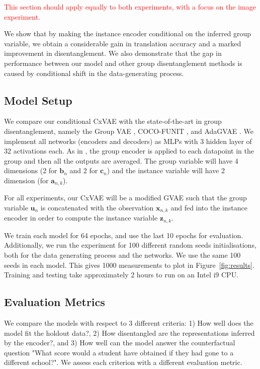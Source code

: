 \documentclass{article} %
\newcommand{\todo}[1]{\textcolor{red}{#1}}
\begin{document}
\todo{This section should apply equally to both experiments, with a focus on the image experiment.}

We show that by making the instance encoder conditional on the inferred group variable, we obtain a considerable gain in translation accuracy and a marked improvement in disentanglement. We also demonstrate that the gap in performance between our model and other group disentanglement methods is caused by conditional shift in the data-generating process.

\subsection{Model Setup}
\label{sec:setup}

We compare our conditional CxVAE with the state-of-the-art in group disentanglement, namely the Group VAE \citep{Hosoya2019GroupbasedLO, Bouchacourt2018MultiLevelVA}, COCO-FUNIT \citep{Saito2020Coco}, and AdaGVAE \citep{Locatello2019ChallengingCA}. We implement all networks (encoders and decoders) as MLPs with 3 hidden layer of 32 activations each. As in \citet{Hosoya2019GroupbasedLO}, the group encoder is applied to each datapoint in the group and then all the outputs are averaged. The group variable will have 4 dimensions (2 for $\mathbf{b}_n$ and 2 for $\mathbf{c}_n$) and the instance variable will have 2 dimension (for $\mathbf{a}_{n,k}$). 

For all experiments, our CxVAE will be a modified GVAE such that the group variable $\mathbf{u}_n$ is concatenated with the observation $\mathbf{x}_{n,k}$ and fed into the instance encoder in order to compute the instance variable $\mathbf{z}_{n,k}$.

We train each model for 64 epochs, and use the last 10 epochs for evaluation. Additionally, we run the experiment for 100 different random seeds initialisations, both for the data generating process and the networks. We use the same 100 seeds in each model. This gives 1000 measurements to plot in Figure~\ref{fig:results}. Training and testing take approximately 2 hours to run on an Intel i9 CPU.

\subsection{Evaluation Metrics}

We compare the models with respect to 3 different criteria: 1) How well does the model fit the holdout data?, 2) How disentangled are the representations inferred by the encoder?, and 3) How well can the model answer the counterfactual question "What score would a student have obtained if they had gone to a different school?". We assess each criterion with a different evaluation metric.
\end{document}
